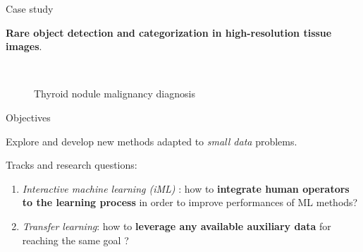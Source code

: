 \documentclass{beamer}
\begin{document}
\begin{frame}{Case study}
	\begin{center}
		\textbf{Rare object detection and categorization in high-resolution tissue images}.
	\end{center}
		
	\begin{figure}[h]
		\center
		\caption{Thyroid nodule malignancy diagnosis}
		 \\
	\end{figure}

	\vfill
\end{frame}


\begin{frame}{Objectives}
	\begin{center}
		\large
		Explore and develop new methods adapted to \textit{small data} problems.
	\end{center}
	
	\vfill
	Tracks and research questions: 
	\begin{enumerate}
		\item \textit{Interactive machine learning (iML)} : how to \textbf{integrate human operators to the learning process} in order to improve performances of ML methods?
		\item \textit{Transfer learning}: how to \textbf{leverage any available auxiliary data} for reaching the same goal ? 
	\end{enumerate}

\end{frame}
 
\end{document}
